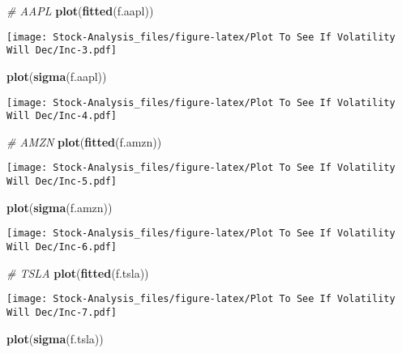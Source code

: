 \documentclass[
]{article}
\newenvironment{Shaded}{\begin{snugshade}}{\end{snugshade}}
\newcommand{\CommentTok}[1]{\textcolor[rgb]{0.56,0.35,0.01}{\textit{#1}}}
\newcommand{\KeywordTok}[1]{\textcolor[rgb]{0.13,0.29,0.53}{\textbf{#1}}}
\newcommand{\NormalTok}[1]{#1}
\begin{document}
\begin{Shaded}
\begin{Highlighting}[]
\CommentTok{# AAPL}
\KeywordTok{plot}\NormalTok{(}\KeywordTok{fitted}\NormalTok{(f.aapl))}
\end{Highlighting}
\end{Shaded}

\texttt{[image: Stock-Analysis\_files/figure-latex/Plot To See If Volatility Will Dec/Inc-3.pdf]}

\begin{Shaded}
\begin{Highlighting}[]
\KeywordTok{plot}\NormalTok{(}\KeywordTok{sigma}\NormalTok{(f.aapl))}
\end{Highlighting}
\end{Shaded}

\texttt{[image: Stock-Analysis\_files/figure-latex/Plot To See If Volatility Will Dec/Inc-4.pdf]}

\begin{Shaded}
\begin{Highlighting}[]
\CommentTok{# AMZN}
\KeywordTok{plot}\NormalTok{(}\KeywordTok{fitted}\NormalTok{(f.amzn))}
\end{Highlighting}
\end{Shaded}

\texttt{[image: Stock-Analysis\_files/figure-latex/Plot To See If Volatility Will Dec/Inc-5.pdf]}

\begin{Shaded}
\begin{Highlighting}[]
\KeywordTok{plot}\NormalTok{(}\KeywordTok{sigma}\NormalTok{(f.amzn))}
\end{Highlighting}
\end{Shaded}

\texttt{[image: Stock-Analysis\_files/figure-latex/Plot To See If Volatility Will Dec/Inc-6.pdf]}

\begin{Shaded}
\begin{Highlighting}[]
\CommentTok{# TSLA}
\KeywordTok{plot}\NormalTok{(}\KeywordTok{fitted}\NormalTok{(f.tsla))}
\end{Highlighting}
\end{Shaded}

\texttt{[image: Stock-Analysis\_files/figure-latex/Plot To See If Volatility Will Dec/Inc-7.pdf]}

\begin{Shaded}
\begin{Highlighting}[]
\KeywordTok{plot}\NormalTok{(}\KeywordTok{sigma}\NormalTok{(f.tsla))}
\end{Highlighting}
\end{Shaded}
\end{document}
